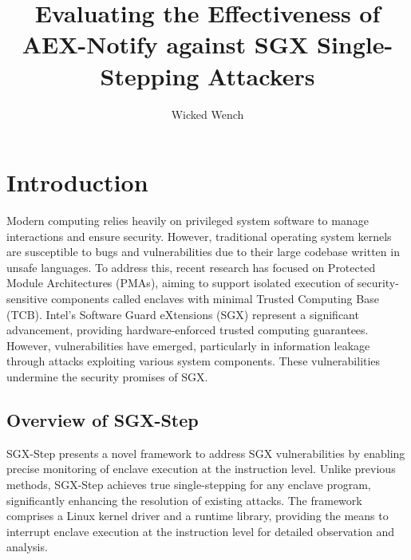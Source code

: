 \documentclass{llncs}
\title{Evaluating the Effectiveness of AEX-Notify against SGX Single-Stepping Attackers}
\author{Wicked Wench}
\institute{	University of L\"ubeck, Germany}
\begin{document}
\maketitle

%


\section{Introduction}


Modern computing relies heavily on privileged system software to manage
interactions and ensure security. However, traditional operating system kernels
are susceptible to bugs and vulnerabilities due to their large codebase written
in unsafe languages. To address this, recent research has focused on Protected
Module Architectures (PMAs), aiming to support isolated execution of
security-sensitive components called enclaves with minimal Trusted Computing
Base (TCB). Intel’s Software Guard eXtensions (SGX)
\cite{intel64and,intel2017intel} represent a significant advancement, providing
hardware-enforced trusted computing guarantees. However, vulnerabilities have
emerged, particularly in information leakage through attacks exploiting various
system components. These vulnerabilities undermine the security promises of
SGX.

\subsection{Overview of SGX-Step}

SGX-Step presents a novel framework to address SGX vulnerabilities by enabling
precise monitoring of enclave execution at the instruction level. Unlike
previous methods, SGX-Step achieves true single-stepping for any enclave
program, significantly enhancing the resolution of existing attacks. The
framework comprises a Linux kernel driver and a runtime library, providing the
means to interrupt enclave execution at the instruction level for detailed
observation and analysis.
\end{document}
